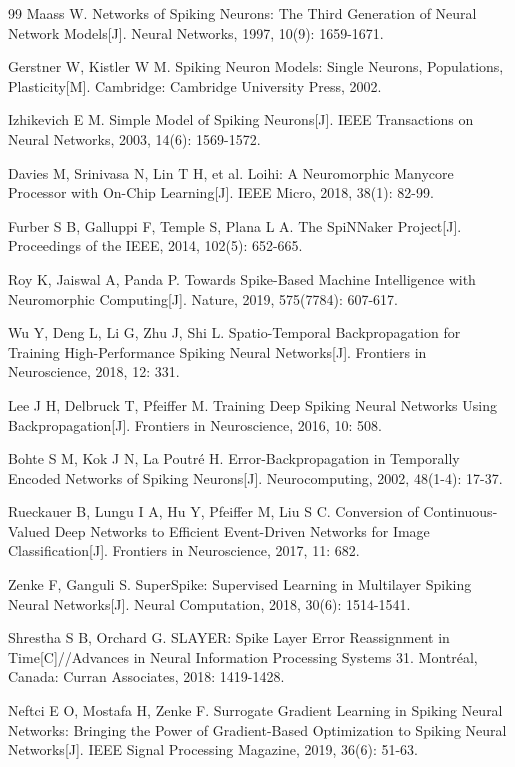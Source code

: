 \documentclass[UTF8,zihao=-4,oneside,openany]{ctexbook}
\begin{document}
\begin{thebibliography}{99}
Maass W. Networks of Spiking Neurons: The Third Generation of Neural Network Models[J]. Neural Networks, 1997, 10(9): 1659-1671.

Gerstner W, Kistler W M. Spiking Neuron Models: Single Neurons, Populations, Plasticity[M]. Cambridge: Cambridge University Press, 2002.

Izhikevich E M. Simple Model of Spiking Neurons[J]. IEEE Transactions on Neural Networks, 2003, 14(6): 1569-1572.

Davies M, Srinivasa N, Lin T H, et al. Loihi: A Neuromorphic Manycore Processor with On-Chip Learning[J]. IEEE Micro, 2018, 38(1): 82-99.

Furber S B, Galluppi F, Temple S, Plana L A. The SpiNNaker Project[J]. Proceedings of the IEEE, 2014, 102(5): 652-665.

Roy K, Jaiswal A, Panda P. Towards Spike-Based Machine Intelligence with Neuromorphic Computing[J]. Nature, 2019, 575(7784): 607-617.

Wu Y, Deng L, Li G, Zhu J, Shi L. Spatio-Temporal Backpropagation for Training High-Performance Spiking Neural Networks[J]. Frontiers in Neuroscience, 2018, 12: 331.

Lee J H, Delbruck T, Pfeiffer M. Training Deep Spiking Neural Networks Using Backpropagation[J]. Frontiers in Neuroscience, 2016, 10: 508.

Bohte S M, Kok J N, La Poutré H. Error-Backpropagation in Temporally Encoded Networks of Spiking Neurons[J]. Neurocomputing, 2002, 48(1-4): 17-37.

Rueckauer B, Lungu I A, Hu Y, Pfeiffer M, Liu S C. Conversion of Continuous-Valued Deep Networks to Efficient Event-Driven Networks for Image Classification[J]. Frontiers in Neuroscience, 2017, 11: 682.

Zenke F, Ganguli S. SuperSpike: Supervised Learning in Multilayer Spiking Neural Networks[J]. Neural Computation, 2018, 30(6): 1514-1541.

Shrestha S B, Orchard G. SLAYER: Spike Layer Error Reassignment in Time[C]//Advances in Neural Information Processing Systems 31. Montréal, Canada: Curran Associates, 2018: 1419-1428.

Neftci E O, Mostafa H, Zenke F. Surrogate Gradient Learning in Spiking Neural Networks: Bringing the Power of Gradient-Based Optimization to Spiking Neural Networks[J]. IEEE Signal Processing Magazine, 2019, 36(6): 51-63.


\end{thebibliography}
\end{document}
